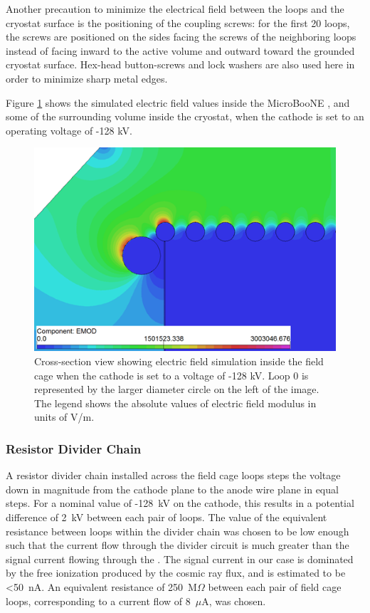 Another precaution to minimize the electrical field between the loops and the cryostat surface is the positioning of the coupling screws: for the first 20 loops, the screws are positioned on the sides facing the screws of the neighboring loops instead of facing inward to the \lartpc active volume and outward toward the grounded cryostat surface. Hex-head button-screws and lock washers are also used here in order to minimize sharp metal edges.

Figure \ref{fig:efield} shows the simulated electric field values inside the MicroBooNE \lartpc, and some of the surrounding volume inside the cryostat, when the cathode is set to an operating voltage of -128 kV.  

\begin{figure}
\centering	
\includegraphics[width=0.7\linewidth]{figures/efield.png}
\caption{Cross-section view showing electric field simulation inside the field cage when the cathode is set to a voltage of -128 kV.  Loop 0 is represented by the larger diameter circle on the left of the image.  The legend shows the absolute values of electric field modulus in units of V/m.}
\label{fig:efield}
\end{figure}



\subsubsection{Resistor Divider Chain}

A resistor divider chain installed across the field cage loops steps the voltage down in magnitude from the cathode plane to the anode wire plane in equal steps.  For a nominal value of -128~kV on the cathode, this results in a potential difference of 2~kV between each pair of loops. The value of the equivalent resistance between loops within the divider chain was chosen to be low enough such that the current flow through the divider circuit is much greater than the signal current flowing through the \lartpc. The signal current in our case is dominated by the free ionization produced by the cosmic ray flux, and is estimated to be <50~nA.  An equivalent resistance of 250~M$\Omega$ between each pair of field cage loops, corresponding to a current flow of 8~$\mu$A, was chosen.  

